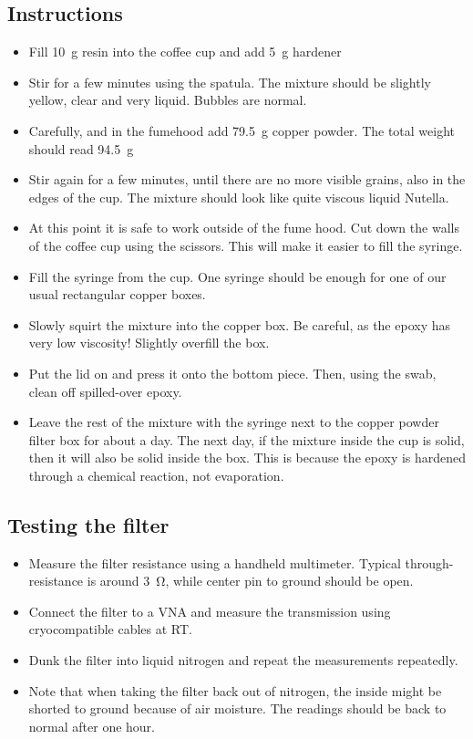 \subsection{Instructions}
\begin{itemize}
	\item Fill \SI{10}{\gram} resin into the coffee cup and add \SI{5}{\gram} hardener
	\item Stir for a few minutes using the spatula.
	The mixture should be slightly yellow, clear and very liquid.
	Bubbles are normal.
	\item Carefully, and in the fumehood add \SI{79.5}{\gram} copper powder.
	The total weight should read \SI{94.5}{\gram}
	\item Stir again for a few minutes, until there are no more visible grains, also in the edges of the cup.
	The mixture should look like quite viscous liquid Nutella.
	\item At this point it is safe to work outside of the fume hood.
	Cut down the walls of the coffee cup using the scissors.
	This will make it easier to fill the syringe.
	\item Fill the syringe from the cup. 
	One syringe should be enough for one of our usual rectangular copper boxes.
	\item Slowly squirt the mixture into the copper box.
	Be careful, as the epoxy has very low viscosity!
	Slightly overfill the box.
	\item Put the lid on and press it onto the bottom piece. Then, using the swab, clean off spilled-over epoxy.
	\item Leave the rest of the mixture with the syringe next to the copper powder filter box for about a day.
	The next day, if the mixture inside the cup is solid, then it will also be solid inside the box.
	This is because the epoxy is hardened through a chemical reaction, not evaporation.
\end{itemize}

\subsection{Testing the filter}
\begin{itemize}
	\item Measure the filter resistance using a handheld multimeter.
	Typical through-resistance is around \SI{3}{\ohm}, while center pin to ground should be open.
	\item Connect the filter to a VNA and measure the transmission using cryocompatible cables at RT.
	\item Dunk the filter into liquid nitrogen and repeat the measurements repeatedly.
	\item Note that when taking the filter back out of nitrogen, the inside might be shorted to ground because of air moisture.
	The readings should be back to normal after one hour.
\end{itemize}

\clearpage
{}

